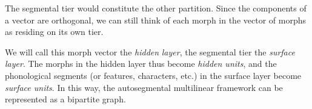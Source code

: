 The segmental tier would constitute the other partition. 
Since the components of a vector are orthogonal, 
we can still think of each morph in the vector of morphs as residing on its own tier.


We will call this morph vector the \emph{hidden} \emph{layer}, 
the segmental tier the \emph{surface} \emph{layer}. The morphs 
in the hidden layer thus become \emph{hidden units}, and the phonological segments (or features, characters, etc.)
in the surface layer become \emph{surface units}.
In this way, the autosegmental multilinear framework can be 
represented as a bipartite graph.




